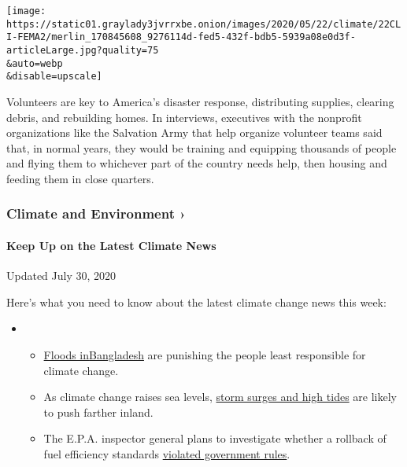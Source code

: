 \texttt{[image: https://static01.graylady3jvrrxbe.onion/images/2020/05/22/climate/22CLI-FEMA2/merlin\_170845608\_9276114d-fed5-432f-bdb5-5939a08e0d3f-articleLarge.jpg?quality=75\\\&auto=webp\\\&disable=upscale]}

Volunteers are key to America's disaster response, distributing
supplies, clearing debris, and rebuilding homes. In interviews,
executives with the nonprofit organizations like the Salvation Army that
help organize volunteer teams said that, in normal years, they would be
training and equipping thousands of people and flying them to whichever
part of the country needs help, then housing and feeding them in close
quarters.

\href{https://www.nytimes3xbfgragh.onion/section/climate?action=click\&pgtype=Article\&state=default\&region=MAIN_CONTENT_1\&context=storylines_keepup}{}

\hypertarget{climate-and-environment-}{%
\subsubsection{Climate and Environment
›}\label{climate-and-environment-}}

\hypertarget{keep-up-on-the-latest-climate-news}{%
\paragraph{Keep Up on the Latest Climate
News}\label{keep-up-on-the-latest-climate-news}}

Updated July 30, 2020

Here's what you need to know about the latest climate change news this
week:

\begin{itemize}
\item
  \begin{itemize}
  \tightlist
  \item
    \href{https://www.nytimes3xbfgragh.onion/2020/07/30/climate/bangladesh-floods.html?action=click\&pgtype=Article\&state=default\&region=MAIN_CONTENT_1\&context=storylines_keepup}{Floods
    in}\href{https://www.nytimes3xbfgragh.onion/2020/07/30/climate/bangladesh-floods.html?action=click\&pgtype=Article\&state=default\&region=MAIN_CONTENT_1\&context=storylines_keepup}{Bangladesh}
    are punishing the people least responsible for climate change.
  \item
    As climate change raises sea levels,
    \href{https://www.nytimes3xbfgragh.onion/2020/07/30/climate/sea-level-inland-floods.html?action=click\&pgtype=Article\&state=default\&region=MAIN_CONTENT_1\&context=storylines_keepup}{storm
    surges and high tides} are likely to push farther inland.
  \item
    The E.P.A. inspector general plans to investigate whether a rollback
    of fuel efficiency standards
    \href{https://www.nytimes3xbfgragh.onion/2020/07/27/climate/trump-fuel-efficiency-rule.html?action=click\&pgtype=Article\&state=default\&region=MAIN_CONTENT_1\&context=storylines_keepup}{violated
    government rules}.
  \end{itemize}
\end{itemize}

